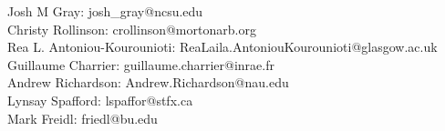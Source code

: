 \documentclass[11pt,a4paper]{article}
\begin{document}
Josh M Gray: josh\_gray@ncsu.edu\\
Christy Rollinson: crollinson@mortonarb.org\\
Rea L. Antoniou-Kourounioti: ReaLaila.AntoniouKourounioti@glasgow.ac.uk\\
Guillaume Charrier: guillaume.charrier@inrae.fr\\
Andrew Richardson: Andrew.Richardson@nau.edu\\
Lynsay Spafford: lspaffor@stfx.ca\\
Mark Freidl: friedl@bu.edu

\end{document}
